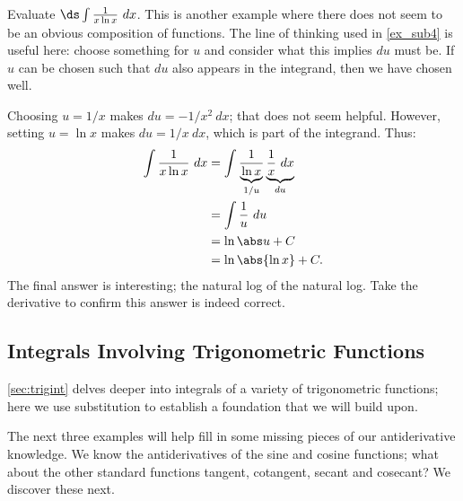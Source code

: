 \begin{example}\label{ex_sub5}
Evaluate $\ds \int \frac{1}{x\ln x}\ dx$.
\solution
This is another example where there does not seem to be an obvious composition of functions. The line of thinking used in \autoref{ex_sub4} is useful here: choose something for $u$ and consider what this implies $du$ must be. If $u$ can be chosen such that $du$ also appears in the integrand, then we have chosen well.

Choosing $u = 1/x$ makes $du = -1/x^2\ dx$; that does not seem helpful. However, setting $u = \ln x$ makes $du = 1/x\ dx$, which is part of the integrand. Thus:
\begin{align*}
	\int \frac1{x\ln x}\ dx
	&= \int \frac{1}{\underbrace{\ln x}_{1/u}}\underbrace{\frac1x\ dx}_{du} \\
	&= \int \frac1u\ du \\
	&= \ln \abs u + C \\
	&= \ln \abs{\ln x} + C.
\end{align*}
The final answer is interesting; the natural log of the natural log. Take the derivative to confirm this answer is indeed correct.
\end{example}

\subsection{Integrals Involving Trigonometric Functions}

\autoref{sec:trigint} delves deeper into integrals of a variety of trigonometric functions; here we use substitution to establish a foundation that we will build upon. 

The next three examples will help fill in some missing pieces of our antiderivative knowledge. We know the antiderivatives of the sine and cosine functions; what about the other standard functions tangent, cotangent, secant and cosecant? We discover these next.

